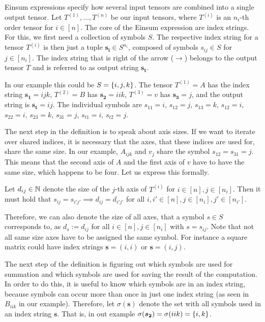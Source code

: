 \begin{definition}
    Einsum expressions specify how several input tensors are combined into a single output tensor.
    Let $T^{(1)},\dots,T^{(n)}$ be our input tensors,
    where $T^{(i)}$ is an $n_i$-th order tensor for $i \in [n]$.
    The core of the Einsum expression are index strings. For this, we first need a collection of symbols $S$.
    The respective index string for a tensor $T^{(i)}$ is then just a tuple $\bm{s_i} \in S^{n_i}$,
    composed of symbols $s_{ij} \in S$ for $j \in [n_i]$.
    The index string that is right of the arrow ($\rightarrow$) belongs to the output tensor $T$ and is referred to as output string $\bm{s_t}$.

    In our example this could be $S = \lbrace i,j,k \rbrace$.
    The tensor $T^{(1)} = A$ has the index string $\bm{s_1} = ijk$,
    $T^{(2)} = B$ has $\bm{s_2} = iik$,
    $T^{(3)} = v$ has $\bm{s_3} = j$,
    and the output string is $\bm{s_t} = ij$.
    The individual symbols are $s_{11} = i$, $s_{12} = j$, $s_{13} = k$, $s_{12} = i$, $s_{22} = i$, $s_{23} = k$, $s_{31} = j$, $s_{t1} = i$, $s_{t2} = j$.

    The next step in the definition is to speak about axis sizes.
    If we want to iterate over shared indices, it is necessary that the axes, that these indices are used for, share the same size.
    In our example, $A_{ijk}$ and $v_j$ share the symbol $s_{12} = s_{31} = j$.
    This means that the second axis of $A$ and the first axis of $v$ have to have the same size, which happens to be four.
    Let us express this formally.

    Let $d_{ij} \in \mathbb{N}$ denote the size of the $j$-th axis of $T^{(i)}$ for $i \in [n], j \in [n_i]$.
    Then it must hold that $s_{ij} = s_{i'j'} \implies d_{ij} = d_{i'j'}$ for all $i,i' \in [n], j \in [n_i], j' \in [n_{i'}]$.

    Therefore, we can also denote the size of all axes, that a symbol $s \in S$ corresponds to, as $d_s := d_{ij}$ for all $i \in [n], j \in [n_i]$ with $s = s_{ij}$.
    Note that not all same size axes have to be assigned the same symbol. For instance a square matrix could have index strings $\bm{s} = (i, i)$ or $\bm{s} = (i, j)$.

    The next step of the definition is figuring out which symbols are used for summation and which symbols are used for saving the result of the computation.
    In order to do this, it is useful to know which symbols are in an index string, because symbols can occur more than once in just one index string (as seen in $B_{iik}$ in our example).
    Therefore, let $\sigma(\bm{s})$ denote the set with all symbols used in an index string $\bm{s}$.
    That is, in out example $\sigma(\bm{s_2}) = \sigma(iik) = \lbrace i, k \rbrace$.


\end{definition}
